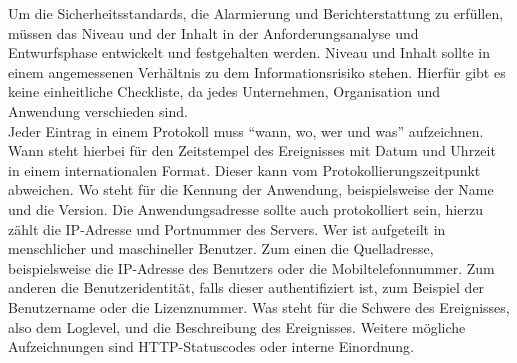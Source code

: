 Um die Sicherheitsstandards, die Alarmierung und Berichterstattung zu erfüllen, müssen das Niveau und der Inhalt in der Anforderungsanalyse und Entwurfsphase entwickelt und festgehalten werden.
Niveau und Inhalt sollte in einem angemessenen Verhältnis zu dem Informationsrisiko stehen.
Hierfür gibt es keine einheitliche Checkliste, da jedes Unternehmen, Organisation und Anwendung verschieden sind.
\\
Jeder Eintrag in einem Protokoll muss \enquote{wann, wo, wer und was} aufzeichnen.
Wann steht hierbei für den Zeitstempel des Ereignisses mit Datum und Uhrzeit in einem internationalen Format.
Dieser kann vom Protokollierungszeitpunkt abweichen.
Wo steht für die Kennung der Anwendung, beispielsweise der Name und die Version.
Die Anwendungsadresse sollte auch protokolliert sein, hierzu zählt die IP-Adresse und Portnummer des Servers.
Wer ist aufgeteilt in menschlicher und maschineller Benutzer.
Zum einen die Quelladresse, beispielsweise die IP-Adresse des Benutzers oder die Mobiltelefonnummer.
Zum anderen die Benutzeridentität, falls dieser authentifiziert ist, zum Beispiel der Benutzername oder die Lizenznummer.
Was steht für die Schwere des Ereignisses, also dem Loglevel, und die Beschreibung des Ereignisses.
Weitere mögliche Aufzeichnungen sind HTTP-Statuscodes oder interne Einordnung.
\\

